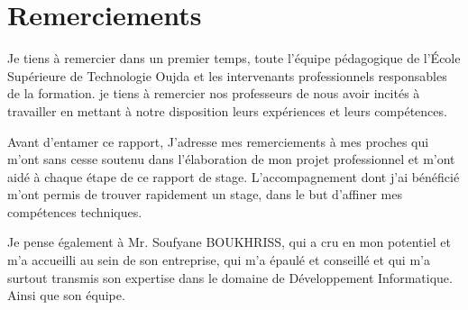 \chapter*{Remerciements}


\hspace{16pt}Je tiens à remercier dans un premier temps, toute l’équipe pédagogique
de l’École Supérieure de Technologie Oujda et les intervenants professionnels
responsables de la formation. je tiens à remercier nos professeurs de nous
avoir incités à travailler en mettant à notre disposition leurs expériences et
leurs compétences.
\vspace{12pt}

Avant d’entamer ce rapport, J’adresse mes remerciements à mes proches
qui m’ont sans cesse soutenu dans l’élaboration de mon projet professionnel
et m’ont aidé à chaque étape de ce rapport de stage. L’accompagnement
dont j’ai bénéficié m’ont permis de trouver rapidement un stage, dans le but
d’affiner mes compétences techniques.
\vspace{12pt}

Je pense également à Mr. Soufyane BOUKHRISS, qui a cru en mon potentiel
et m’a accueilli au sein de son entreprise, qui m’a épaulé et conseillé et
qui m’a surtout transmis son expertise dans le domaine de Développement
Informatique. Ainsi que son équipe.
